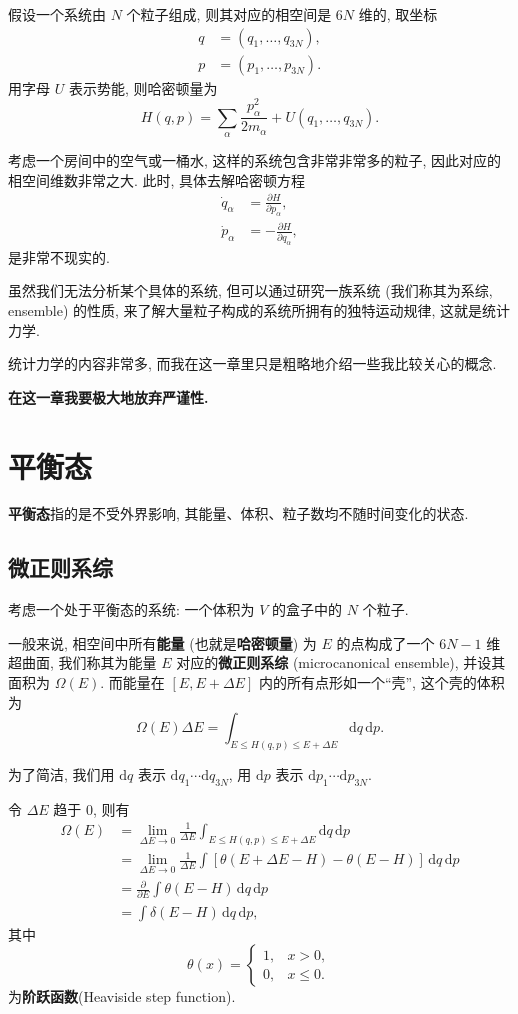 假设一个系统由 $ N $ 个粒子组成, 则其对应的相空间是 $ 6N $ 维的, 取坐标
\begin{align*}
    q&=(q_1,\dots,q_{3N}),\\
    p&=(p_1,\dots,p_{3N}).    
\end{align*}
用字母 $ U $ 表示势能, 则哈密顿量为
\[ H(q,p)=\sum_{\alpha}\frac{p_\alpha^2}{2m_\alpha}+U(q_1,\dots,q_{3N}). \]

考虑一个房间中的空气或一桶水, 这样的系统包含非常非常多的粒子, 因此对应的相空间维数非常之大. 此时, 具体去解哈密顿方程
\begin{align*}
    \dot{q}_{\alpha}&=\frac{\partial H}{\partial p_\alpha},\\ 
    \dot{p}_{\alpha}&=-\frac{\partial H}{\partial q_\alpha},
\end{align*}
是非常不现实的. 

虽然我们无法分析某个具体的系统, 但可以通过研究一族系统 (我们称其为系综, ensemble) 的性质, 来了解大量粒子构成的系统所拥有的独特运动规律, 这就是统计力学.

统计力学的内容非常多, 而我在这一章里只是粗略地介绍一些我比较关心的概念. 

\textbf{在这一章我要极大地放弃严谨性.}
\section{平衡态}
{\bf 平衡态}指的是不受外界影响, 其能量、体积、粒子数均不随时间变化的状态. 
\subsection{微正则系综}
考虑一个处于平衡态的系统: 一个体积为 $ V $ 的盒子中的 $ N $ 个粒子. 

一般来说, 相空间中所有{\bf 能量} (也就是{\bf 哈密顿量}) 为 $ E $ 的点构成了一个 $ 6N-1 $ 维超曲面, 我们称其为能量 $ E $ 对应的{\bf 微正则系综} (microcanonical ensemble), 并设其面积为 $ \Omega(E) $. 而能量在 $ [E,E+\Delta E] $ 内的所有点形如一个``壳'', 这个壳的体积为
\[ \Omega(E)\Delta E = \int_{E\leqslant H(q,p)\leqslant E+\Delta E}\mathrm{d}q\,\mathrm{d}p. \]
\begin{remark}
    为了简洁, 我们用 $\mathrm{d}q$ 表示 $\mathrm{d}q_1\cdots\mathrm{d}q_{3N}$, 用 $\mathrm{d}p$ 表示 $\mathrm{d}p_1\cdots\mathrm{d}p_{3N}$.
\end{remark}
令 $ \Delta E $ 趋于 $ 0 $, 则有
\begin{align*}
    \Omega(E) &= \lim_{\Delta E\to 0}\frac{1}{\Delta E}\int_{E\leqslant H(q,p)\leqslant E+\Delta E}\mathrm{d}q\,\mathrm{d}p\\ 
    &=\lim_{\Delta E\to 0}\frac{1}{\Delta E}\int[\theta(E+\Delta E-H)-\theta(E-H)]\,\mathrm{d}q\,\mathrm{d}p\\ 
    &=\frac{\partial}{\partial E}\int\theta(E-H)\,\mathrm{d}q\,\mathrm{d}p\\ 
    &= \int\delta(E-H)\,\mathrm{d}q\,\mathrm{d}p,
\end{align*}
其中
\[ \theta(x)=\begin{cases}
    1, & x>0,\\
    0, & x\leqslant 0. \end{cases} \]
为{\bf 阶跃函数}(Heaviside step function).


